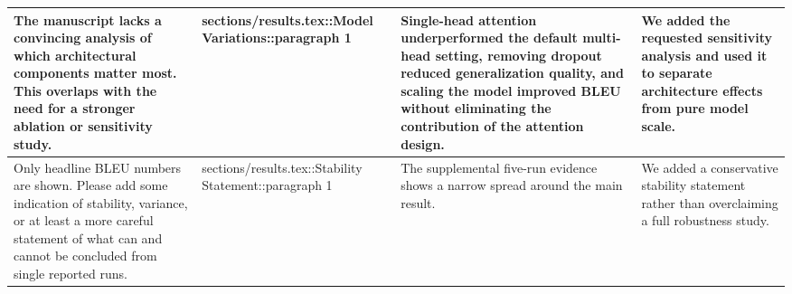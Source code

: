 \documentclass{article}
\begin{document}
\begin{longtable}{|p{}|p{}|p{}|p{}|}
\hline
The manuscript lacks a convincing analysis of which architectural components matter most. This overlaps with the need for a stronger ablation or sensitivity study. & sections/results.tex::Model Variations::paragraph 1 & Single-head attention underperformed the default multi-head setting, removing dropout reduced generalization quality, and scaling the model improved BLEU without eliminating the contribution of the attention design. & We added the requested sensitivity analysis and used it to separate architecture effects from pure model scale. \\
\hline
Only headline BLEU numbers are shown. Please add some indication of stability, variance, or at least a more careful statement of what can and cannot be concluded from single reported runs. & sections/results.tex::Stability Statement::paragraph 1 & The supplemental five-run evidence shows a narrow spread around the main result. & We added a conservative stability statement rather than overclaiming a full robustness study. \\
\hline
\end{longtable}
\end{document}
